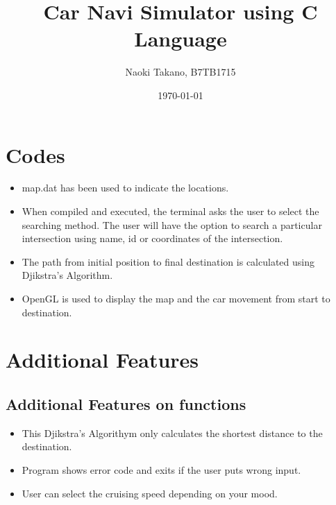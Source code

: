 \documentclass{article}
\title{Car Navi Simulator using C Language}
\author{Naoki Takano, B7TB1715}
\date{\today}
\begin{document}
\maketitle

\section{Codes}

\begin{itemize}
\item map.dat has been used to indicate the locations.
\item When compiled and executed, the terminal asks the user to select the searching method. The user will have the option to search a particular intersection using name, id or coordinates of the intersection.
\item The path from initial position to final destination is calculated using Djikstra's Algorithm. 
\item OpenGL is used to display the map and the car movement from start to destination.
\end{itemize}


\section{Additional Features}
\subsection{Additional Features on functions}
\begin{itemize}
	\item This Djikstra's Algorithym only calculates the shortest distance to the destination.
	\item Program shows error code and exits if the user puts wrong input.
	\item User can select the cruising speed depending on your mood.
\end{itemize}
\end{document}
